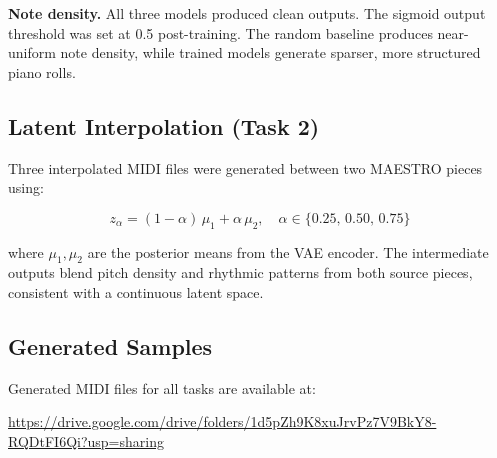 \documentclass{article} %
\begin{document}
\textbf{Note density.}
All three models produced clean outputs. The sigmoid output threshold was set at 0.5 post-training. The random baseline produces near-uniform note density, while trained models generate sparser, more structured piano rolls.

\subsection{Latent Interpolation (Task 2) \citep{Roberts2018AHV}}

Three interpolated MIDI files were generated between two MAESTRO pieces using:

\[
  z_\alpha = (1-\alpha)\,\mu_1 + \alpha\,\mu_2, \quad \alpha \in \{0.25,\, 0.50,\, 0.75\}
\]

where $\mu_1, \mu_2$ are the posterior means from the VAE encoder. The intermediate outputs blend pitch density and rhythmic patterns from both source pieces, consistent with a continuous latent space.

\subsection{Generated Samples}

Generated MIDI files for all tasks are available at:
\begin{center}
\url{https://drive.google.com/drive/folders/1d5pZh9K8xuJrvPz7V9BkY8-RQDtFI6Qi?usp=sharing}
\end{center}



\end{document}
